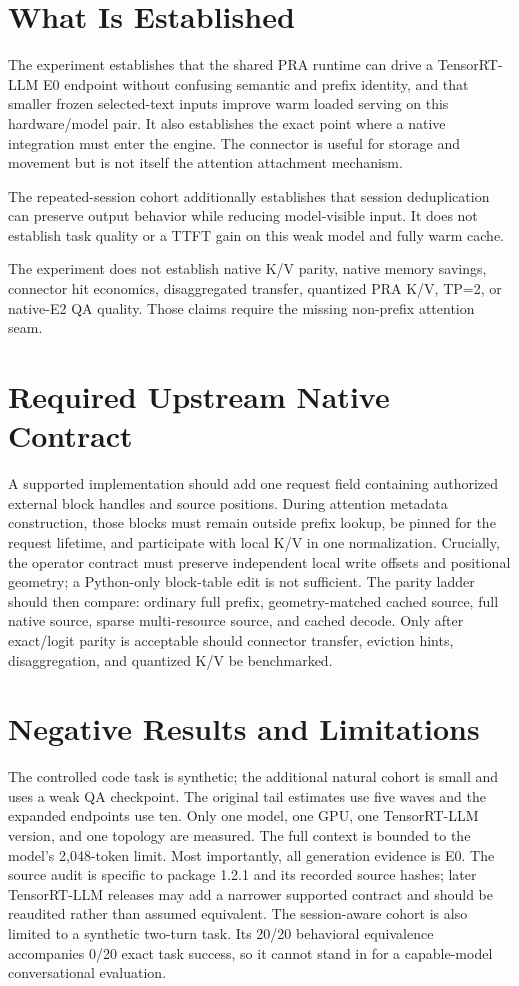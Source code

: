 \documentclass[10pt]{article}
\begin{document}
\clearpage

\section{What Is Established}
The experiment establishes that the shared PRA runtime can drive a
TensorRT-LLM E0 endpoint without confusing semantic and prefix identity, and
that smaller frozen selected-text inputs improve warm loaded serving on this
hardware/model pair. It also establishes the exact point where a native
integration must enter the engine. The connector is useful for storage and
movement but is not itself the attention attachment mechanism.

The repeated-session cohort additionally establishes that session deduplication
can preserve output behavior while reducing model-visible input. It does not
establish task quality or a TTFT gain on this weak model and fully warm cache.

The experiment does not establish native K/V parity, native memory savings,
connector hit economics, disaggregated transfer, quantized PRA K/V, TP=2, or
native-E2 QA quality. Those claims require the missing non-prefix attention seam.

\section{Required Upstream Native Contract}
A supported implementation should add one request field containing
authorized external block handles and source positions. During attention
metadata construction, those blocks must remain outside prefix lookup, be
pinned for the request lifetime, and participate with local K/V in one
normalization. Crucially, the operator contract must preserve independent
local write offsets and positional geometry; a Python-only block-table edit is
not sufficient. The parity ladder should then compare: ordinary full prefix,
geometry-matched cached source, full native source, sparse multi-resource
source, and cached decode. Only after exact/logit parity is acceptable should
connector transfer, eviction hints, disaggregation, and quantized K/V be
benchmarked.

\section{Negative Results and Limitations}
The controlled code task is synthetic; the additional natural cohort is small
and uses a weak QA checkpoint. The original tail estimates use five waves and
the expanded endpoints use ten. Only one
model, one GPU, one TensorRT-LLM version, and one topology are measured. The
full context is bounded to the model's 2,048-token limit. Most importantly,
all generation evidence is E0.
The source audit is specific to package 1.2.1 and its recorded source hashes;
later TensorRT-LLM releases may add a narrower supported contract and should be
reaudited rather than assumed equivalent.
The session-aware cohort is also limited to a synthetic two-turn task. Its
20/20 behavioral equivalence accompanies 0/20 exact task success, so it cannot
stand in for a capable-model conversational evaluation.
\end{document}
